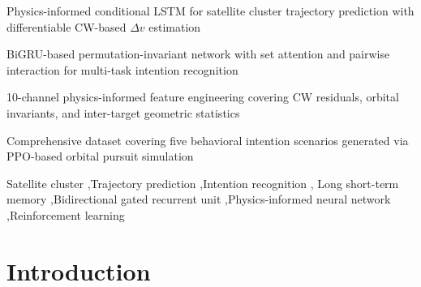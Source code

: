 \documentclass[a4paper,fleqn]{cas-dc}
\begin{document}

\begin{highlights}
    \item Physics-informed conditional LSTM for satellite cluster trajectory prediction with differentiable CW-based $\Delta v$ estimation
    \item BiGRU-based permutation-invariant network with set attention and pairwise interaction for multi-task intention recognition
    \item 10-channel physics-informed feature engineering covering CW residuals, orbital invariants, and inter-target geometric statistics
    \item Comprehensive dataset covering five behavioral intention scenarios generated via PPO-based orbital pursuit simulation
\end{highlights}

\begin{keywords}
    Satellite cluster \sep Trajectory prediction \sep Intention recognition \sep
    Long short-term memory \sep Bidirectional gated recurrent unit \sep Physics-informed neural network \sep Reinforcement learning
\end{keywords}

\maketitle


\section{Introduction}\label{sec:intro}
\end{document}

